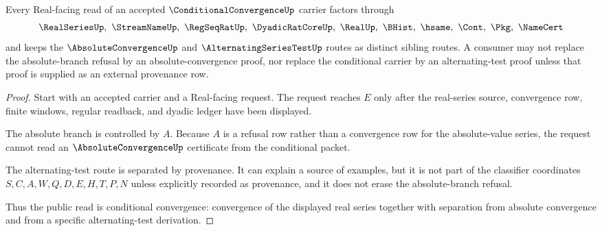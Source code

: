 \begin{theorem}
\label{thm:conditional-convergence-sibling-separation}
Every Real-facing read of an accepted $\ConditionalConvergenceUp$ carrier factors through
$$
\RealSeriesUp,\ \StreamNameUp,\ \RegSeqRatUp,\ \DyadicRatCoreUp,\ \RealUp,\ \BHist,\ \hsame,\ \Cont,\ \Pkg,\ \NameCert
$$
and keeps the $\AbsoluteConvergenceUp$ and $\AlternatingSeriesTestUp$ routes as distinct sibling routes. A consumer may not replace the absolute-branch refusal by an absolute-convergence proof, nor replace the conditional carrier by an alternating-test proof unless that proof is supplied as an external provenance row.
\end{theorem}
\begin{proof}
Start with an accepted carrier and a Real-facing request. The request reaches $E$ only after the real-series source, convergence row, finite windows, regular readback, and dyadic ledger have been displayed.

The absolute branch is controlled by $A$. Because $A$ is a refusal row rather than a convergence row for the absolute-value series, the request cannot read an $\AbsoluteConvergenceUp$ certificate from the conditional packet.

The alternating-test route is separated by provenance. It can explain a source of examples, but it is not part of the classifier coordinates $S,C,A,W,Q,D,E,H,T,P,N$ unless explicitly recorded as provenance, and it does not erase the absolute-branch refusal.

Thus the public read is conditional convergence: convergence of the displayed real series together with separation from absolute convergence and from a specific alternating-test derivation.
\end{proof}



